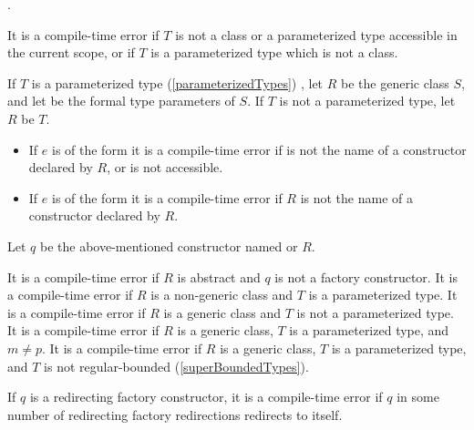 \documentclass[makeidx]{article}
\begin{document}
{.

\LMHash{}%
It is a compile-time error if $T$ is not
a class or a parameterized type accessible in the current scope,
or if $T$ is a parameterized type which is not a class.

\LMHash{}%
If $T$ is a parameterized type (\ref{parameterizedTypes})
,
let $R$ be the generic class $S$,
and let
be the formal type parameters of $S$.
If $T$ is not a parameterized type, let $R$ be $T$.

\begin{itemize}
\item
  If $e$ is of the form
  it is a compile-time error if  is not the name of
  a constructor declared by $R$, or \id{} is not accessible.
\item
  If $e$ is of the form
  it is a compile-time error if $R$ is not the name of
  a constructor declared by $R$.
\end{itemize}

\LMHash{}%
Let $q$ be the above-mentioned constructor named  or $R$.

\LMHash{}%
It is a compile-time error if $R$ is abstract
and $q$ is not a factory constructor.
It is a compile-time error if $R$ is a non-generic class
and $T$ is a parameterized type.
It is a compile-time error if $R$ is a generic class
and $T$ is not a parameterized type.
It is a compile-time error if $R$ is a generic class,
$T$ is a parameterized type, and $m \not= p$.
It is a compile-time error if $R$ is a generic class,
$T$ is a parameterized type,
and $T$ is not regular-bounded
(\ref{superBoundedTypes}).

\LMHash{}%
If $q$ is a redirecting factory constructor,
it is a compile-time error if $q$ in some number of
redirecting factory redirections redirects to itself.

}
\end{document}
